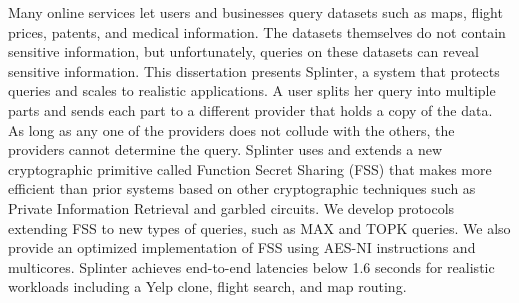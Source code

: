 Many online services let users and businesses query datasets such as maps, flight prices, patents,
and medical information. The datasets themselves do not contain sensitive information,
but unfortunately, queries on these datasets can reveal sensitive information.
This dissertation presents Splinter, a system that protects queries and
scales to realistic applications.
A user splits her query into multiple parts and sends each part 
to a different provider that holds a copy of the data.
As long as any one of the providers does not collude with the
others, the providers cannot determine the query.
Splinter uses and extends a new cryptographic primitive called Function Secret Sharing (FSS) 
that makes more efficient than prior systems based on 
other cryptographic techniques such as Private Information Retrieval and garbled circuits.
We develop protocols extending FSS to new types of queries, such as MAX and TOPK queries. 
We also provide an optimized implementation of FSS using AES-NI instructions and multicores.
Splinter achieves end-to-end latencies below 1.6 seconds for realistic workloads 
including a Yelp clone, flight search, and map routing.

%
